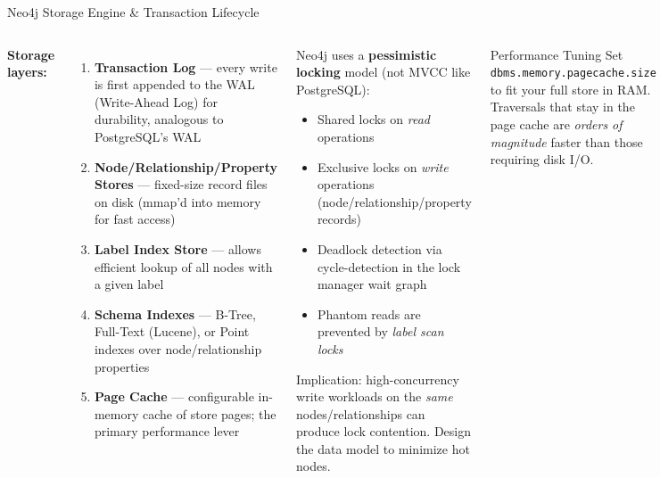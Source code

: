 \documentclass[aspectratio=169]{beamer}
\begin{document}
\begin{frame}{Neo4j Storage Engine \& Transaction Lifecycle}
  \small
  \begin{columns}[T]
      \textbf{Storage layers:}
      \begin{enumerate}\small
        \item \textbf{Transaction Log} — every write is first appended to the WAL (Write-Ahead Log) for durability, analogous to PostgreSQL's WAL
        \item \textbf{Node/Relationship/Property Stores} — fixed-size record files on disk (mmap'd into memory for fast access)
        \item \textbf{Label Index Store} — allows efficient lookup of all nodes with a given label
        \item \textbf{Schema Indexes} — B-Tree, Full-Text (Lucene), or Point indexes over node/relationship properties
        \item \textbf{Page Cache} — configurable in-memory cache of store pages; the primary performance lever
      \end{enumerate}
      \begin{tcolorbox}[deepdivebox, title={Deep Dive: MVCC \& Locking}]
        \scriptsize
        Neo4j uses a \textbf{pessimistic locking} model (not MVCC like PostgreSQL):
        \begin{itemize}
          \item Shared locks on \textit{read} operations
          \item Exclusive locks on \textit{write} operations (node/relationship/property records)
          \item Deadlock detection via cycle-detection in the lock manager wait graph
          \item Phantom reads are prevented by \textit{label scan locks}
        \end{itemize}
        \vspace{0.1cm}
        Implication: high-concurrency write workloads on the \textit{same} nodes/relationships can produce lock contention. Design the data model to minimize hot nodes.
      \end{tcolorbox}
      \vspace{0.2cm}
      \begin{alertblock}{Performance Tuning}
        \scriptsize Set \texttt{dbms.memory.pagecache.size} to fit your full store in RAM. Traversals that stay in the page cache are \textit{orders of magnitude} faster than those requiring disk I/O.
      \end{alertblock}
  \end{columns}
\end{frame}
\end{document}

